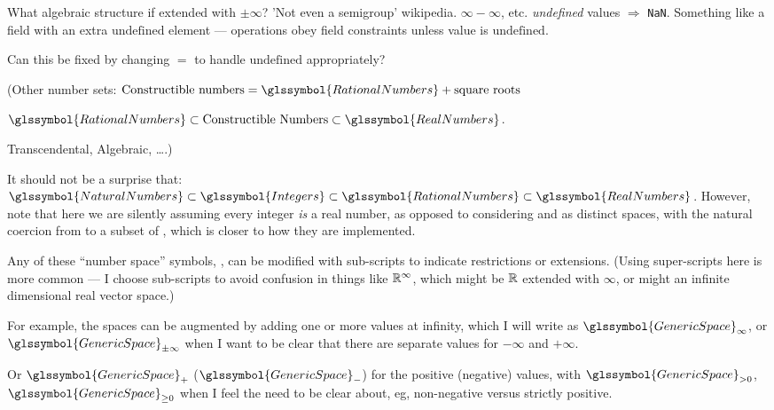 What algebraic structure if extended with $\pm\infty$?
'Not even a semigroup' wikipedia.
$\infty - \infty$, etc. \textit{undefined} values $\Rightarrow$
\texttt{NaN}.
Something like a field with an extra $\text{undefined}$
element --- operations obey field constraints unless value is
$\text{undefined}$.

Can this be fixed by changing $=$ to handle $\text{undefined}$
appropriately?


(Other number sets:
$\text{Constructible numbers} = \glssymbol{RationalNumbers}
+ \text{square roots}$

$\glssymbol{RationalNumbers}
\subset 
\text{Constructible Numbers}
\subset 
\glssymbol{RealNumbers}$.

Transcendental, Algebraic, \ldots.)

It should not be a surprise that:
$\glssymbol{NaturalNumbers} 
\subset 
\glssymbol{Integers}
\subset 
\glssymbol{RationalNumbers}
\subset 
\glssymbol{RealNumbers}$.
However, note that here we are silently assuming every integer
\emph{is} a real number, as opposed to considering  and
 as distinct spaces, with the natural coercion
from  to a subset of ,
which is closer to how they are implemented.

Any of these ``number space'' symbols, ,
can be modified with sub-scripts to indicate restrictions or
extensions. 
(Using super-scripts here is more common --- I choose sub-scripts
to avoid confusion in things like $\mathbb{R}^{\infty}$,
which might be $\mathbb{R}$ extended with ${\infty}$, 
or might an infinite dimensional real vector space.)

For example, the spaces can be 
augmented by adding one or more values at infinity, which I will
write as $\glssymbol{GenericSpace}_{\infty}$,
or $\glssymbol{GenericSpace}_{\pm\infty}$ when I want to be 
clear that there are separate values for $-\infty$ and $+\infty$.

Or $\glssymbol{GenericSpace}_{+}$ ($\glssymbol{GenericSpace}_{-}$)
for the positive (negative) values, with 
$\glssymbol{GenericSpace}_{> 0}$, $\glssymbol{GenericSpace}_{\geq 0}$ 
when I feel the need to be clear about, eg, non-negative versus
strictly positive.

\label{sec:Baire-space}

